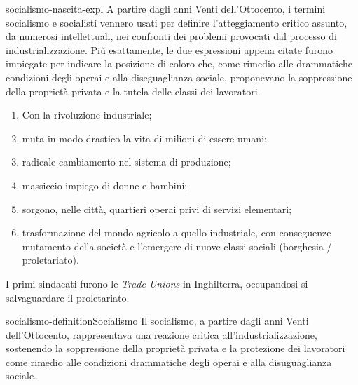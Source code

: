 \documentclass[preview]{standalone}
\begin{document}
\begin{snippet}{socialismo-nascita-expl}
    A partire dagli anni Venti dell'Ottocento, i termini socialismo e socialisti vennero usati per
    definire l'atteggiamento critico assunto, da numerosi intellettuali, nei confronti dei
    problemi provocati dal processo di industrializzazione. Più esattamente, le due espressioni
    appena citate furono impiegate per indicare la posizione di coloro che, come rimedio alle
    drammatiche condizioni degli operai e alla diseguaglianza sociale, proponevano la
    soppressione della proprietà privata e la tutela delle classi dei lavoratori.

    \begin{enumerate}
        \item Con la rivoluzione industriale;
        \item muta in modo drastico la vita di milioni di essere umani;
        \item radicale cambiamento nel sistema di produzione;
        \item massiccio impiego di donne e bambini;
        \item sorgono, nelle città, quartieri operai privi di servizi elementari;
        \item trasformazione del mondo agricolo a quello industriale, con conseguenze mutamento della società e l'emergere di nuove classi sociali (borghesia / proletariato).
    \end{enumerate}
    
    I primi sindacati furono le \textit{Trade Unions} in Inghilterra, occupandosi si salvaguardare il proletariato.
\end{snippet}

\begin{snippetdefinition}{socialismo-definition}{Socialismo}
    Il socialismo, a partire dagli anni Venti dell'Ottocento, rappresentava una reazione critica all'industrializzazione, sostenendo la soppressione della proprietà privata e la protezione dei lavoratori come rimedio alle condizioni drammatiche degli operai e alla disuguaglianza sociale.
\end{snippetdefinition}
\end{document}

